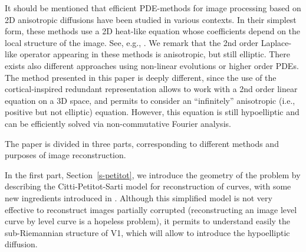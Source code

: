 \documentclass[proc]{edpsmath}
\begin{document}
It should be mentioned that efficient PDE-methods for image processing based on 2D anisotropic diffusions have been studied in various contexts. 
In their simplest form, these methods use a 2D heat-like equation whose coefficients depend on the local structure of the image.  See, e.g., \cite{GWWBBS,Tschum}. 
We remark that the 2nd order Laplace-like operator appearing in these methods is anisotropic, but still elliptic.
There exists also different approaches using non-linear evolutions or higher order PDEs.
The method presented in this paper is deeply different, since the use of the cortical-inspired redundant representation allows to work with a 2nd order linear equation on a 3D space, and permits to consider an ``infinitely'' anisotropic (i.e., positive but not elliptic) equation. However, this equation is still hypoelliptic and can be efficiently solved via non-commutative Fourier analysis.

The paper is divided in three parts, corresponding to different methods and purposes of image reconstruction.

In the first part, Section~\ref{s-petitot}, we introduce the geometry of the problem by describing the Citti-Petitot-Sarti model for reconstruction of curves, with some new ingredients introduced in \cite{Boscain2012a}. Although this simplified model is not very effective to reconstruct images partially corrupted (reconstructing an image level curve by level curve is a hopeless problem), it permits to understand easily the sub-Riemannian structure of V1, which will allow to introduce the hypoelliptic diffusion.

\end{document}
